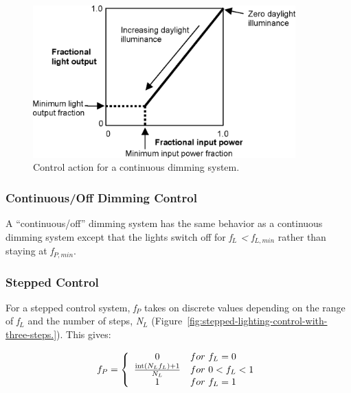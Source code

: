 \begin{figure}[hbtp] %
\centering
\includegraphics[width=0.9\textwidth, height=0.9\textheight, keepaspectratio=true]{media/image823.png}
\caption{Control action for a continuous dimming system. \protect \label{fig:control-action-for-a-continuous-dimming}}
\end{figure}

\subsubsection{Continuous/Off Dimming Control}\label{continuousoff-dimming-control}

A ``continuous/off'' dimming system has the same behavior as a continuous dimming system except that the lights switch off for \emph{f\(_{L}\) \textless{} f\(_{L,min}\)} rather than staying at \emph{f\(_{P,min}\)}.

\subsubsection{Stepped Control}\label{stepped-control}

For a stepped control system, \emph{f\(_{P}\)} takes on discrete values depending on the range of \emph{f\(_{L}\)} and the number of steps, \emph{N\(_{L}\)} (Figure~\ref{fig:stepped-lighting-control-with-three-steps.}). This gives:

\begin{equation}
  f_P = \left\{
          \begin{array}{cl}
            0 & for~f_L = 0 \\
            \frac{\mathop{\rm int} (N_L f_L) + 1}{N_L} & for~0 < f_L < 1 \\
            1 & for~f_L = 1
          \end{array}
         \right.
\end{equation}

